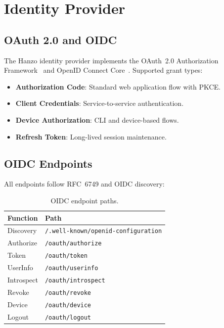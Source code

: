 \documentclass[11pt,a4paper]{article}
\begin{document}
\section{Identity Provider}

\subsection{OAuth 2.0 and OIDC}

The Hanzo identity provider implements the OAuth~2.0 Authorization Framework~\cite{rfc6749} and OpenID Connect Core~\cite{oidc2014}. Supported grant types:

\begin{itemize}
    \item \textbf{Authorization Code}: Standard web application flow with PKCE.
    \item \textbf{Client Credentials}: Service-to-service authentication.
    \item \textbf{Device Authorization}: CLI and device-based flows.
    \item \textbf{Refresh Token}: Long-lived session maintenance.
\end{itemize}

\subsection{OIDC Endpoints}

All endpoints follow RFC~6749 and OIDC discovery:

\begin{table}[h]
\centering
\caption{OIDC endpoint paths.}
\begin{tabular}{ll}
\toprule
\textbf{Function} & \textbf{Path} \\
\midrule
Discovery   & \texttt{/.well-known/openid-configuration} \\
Authorize   & \texttt{/oauth/authorize} \\
Token       & \texttt{/oauth/token} \\
UserInfo    & \texttt{/oauth/userinfo} \\
Introspect  & \texttt{/oauth/introspect} \\
Revoke      & \texttt{/oauth/revoke} \\
Device      & \texttt{/oauth/device} \\
Logout      & \texttt{/oauth/logout} \\
\bottomrule
\end{tabular}
\end{table}
\end{document}
